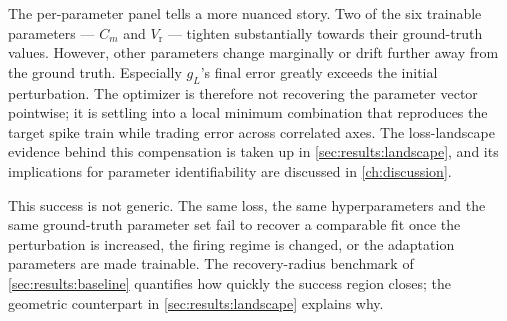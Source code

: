 The per-parameter panel tells a more nuanced story.
Two of the six trainable parameters --- $C_m$ and $V_{\text{r}}$ --- tighten substantially towards their ground-truth values.
However, other parameters change marginally or drift further away from the ground truth.
Especially $g_L$'s final error greatly exceeds the initial perturbation.
The optimizer is therefore not recovering the parameter vector pointwise;
it is settling into a local minimum combination that reproduces the target spike train while trading error across correlated axes.
The loss-landscape evidence behind this compensation is taken up in \cref{sec:results:landscape}, and its implications for parameter identifiability are discussed in \cref{ch:discussion}.

This success is not generic.
The same loss, the same hyperparameters and the same ground-truth parameter set fail to recover a comparable fit once the perturbation is increased,
the firing regime is changed, or the adaptation parameters are made trainable.
The recovery-radius benchmark of \cref{sec:results:baseline} quantifies how quickly the success region closes;
the geometric counterpart in \cref{sec:results:landscape} explains why.


